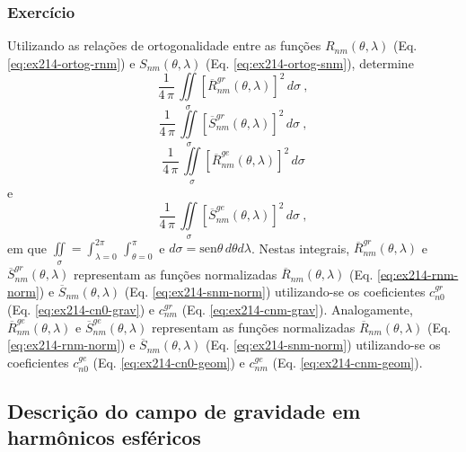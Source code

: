 \documentclass[10pt,a4paper,fleqn]{article}
\begin{document}
\begin{flushleft}
\dotfill
\end{flushleft}

\subsubsection{Exerc\'{i}cio}

Utilizando as rela\c{c}\~{o}es de ortogonalidade entre as fun\c{c}\~{o}es $R_{nm}(\theta, \lambda)$ 
(Eq. \ref{eq:ex214-ortog-rnm}) e $S_{nm}(\theta, \lambda)$ (Eq. \ref{eq:ex214-ortog-snm}),
determine 
$$\dfrac{1}{4 \, \pi} \, \iint \limits_{\sigma} \left[ \overline{R}_{nm}^{gr} (\theta, \lambda)
\right]^{2} \, d \sigma \: ,$$ 
$$\dfrac{1}{4 \, \pi} \, \iint \limits_{\sigma} \left[ \overline{S}_{nm}^{gr} (\theta, \lambda)
\right]^{2} \, d \sigma \: ,$$ 
$$\dfrac{1}{4 \, \pi} \, \iint \limits_{\sigma} \left[ \overline{R}_{nm}^{ge} (\theta, \lambda)
\right]^{2} \, d \sigma$$ 
e
$$\dfrac{1}{4 \, \pi} \, \iint \limits_{\sigma} \left[ \overline{S}_{nm}^{ge}  (\theta, \lambda)
\right]^{2} \, d \sigma \: ,$$
em que $\iint \limits_{\sigma} = \int_{\lambda = 0}^{2\pi} \, \int_{\theta = 0}^{\pi}$ e $d \sigma 
= \text{sen}\theta \, d\theta d\lambda$. Nestas integrais, $\overline{R}_{nm}^{gr} (\theta, \lambda)$ e 
$\overline{S}_{nm}^{gr} (\theta, \lambda)$ representam as fun\c{c}\~{o}es normalizadas $\overline{R}_{nm}
(\theta, \lambda)$ (Eq. \ref{eq:ex214-rnm-norm}) e $\overline{S}_{nm} (\theta, \lambda)$ 
(Eq. \ref{eq:ex214-snm-norm}) utilizando-se os coeficientes $c_{n0}^{gr}$ (Eq. \ref{eq:ex214-cn0-grav}) 
e $c_{nm}^{gr}$ (Eq. \ref{eq:ex214-cnm-grav}). Analogamente, $\overline{R}_{nm}^{ge} (\theta, \lambda)$ 
e $\overline{S}_{nm}^{ge} (\theta, \lambda)$ representam as fun\c{c}\~{o}es normalizadas 
$\overline{R}_{nm} (\theta, \lambda)$ (Eq. \ref{eq:ex214-rnm-norm}) e $\overline{S}_{nm} (\theta, \lambda)$ 
(Eq. \ref{eq:ex214-snm-norm}) utilizando-se os coeficientes $c_{n0}^{ge}$ 
(Eq. \ref{eq:ex214-cn0-geom}) e $c_{nm}^{ge}$ (Eq. \ref{eq:ex214-cnm-geom}).

\begin{flushleft}
\dotfill
\end{flushleft}

\subsection{Descri\c{c}\~{a}o do campo de gravidade em harm\^{o}nicos esf\'{e}ricos}
\end{document}
